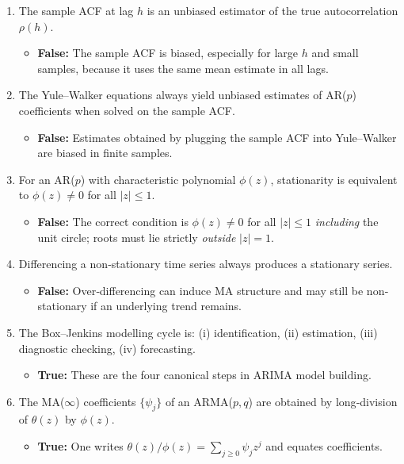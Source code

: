 \documentclass{article}
\begin{document}
\begin{enumerate}
  \item The sample ACF at lag $h$ is an unbiased estimator of the true autocorrelation $\rho(h)$.
  \begin{itemize}
    \item \textbf{False:}  The sample ACF is biased, especially for large $h$ and small samples, because it uses the same mean estimate in all lags.
  \end{itemize}

  \item The Yule–Walker equations always yield unbiased estimates of AR($p$) coefficients when solved on the sample ACF.
  \begin{itemize}
    \item \textbf{False:}  Estimates obtained by plugging the sample ACF into Yule–Walker are biased in finite samples.
  \end{itemize}

  \item For an AR($p$) with characteristic polynomial $\phi(z)$, stationarity is equivalent to $\phi(z)\neq0$ for all $|z|\le1$.
  \begin{itemize}
    \item \textbf{False:} The correct condition is $\phi(z)\neq0$ for all $|z|\le1$ \emph{including} the unit circle; roots must lie strictly \emph{outside} $|z|=1$.
  \end{itemize}

  \item Differencing a non‐stationary time series always produces a stationary series.
  \begin{itemize}
    \item \textbf{False:} Over‐differencing can induce MA structure and may still be non‐stationary if an underlying trend remains.
  \end{itemize}

  \item The Box–Jenkins modelling cycle is: (i) identification, (ii) estimation, (iii) diagnostic checking, (iv) forecasting.
  \begin{itemize}
    \item \textbf{True:}  These are the four canonical steps in ARIMA model building.
  \end{itemize}

  \item The MA($\infty$) coefficients $\{\psi_j\}$ of an ARMA($p,q$) are obtained by long‐division of $\theta(z)$ by $\phi(z)$.
  \begin{itemize}
    \item \textbf{True:}  One writes $\theta(z)/\phi(z)=\sum_{j\ge0}\psi_j z^j$ and equates coefficients.
  \end{itemize}


\end{enumerate}
\end{document}
